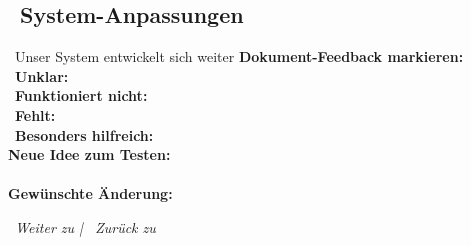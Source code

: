 \subsection*{\faLightbulb~System-Anpassungen}

\begin{ctmmOrangeBox}{\faWrench~Unser System entwickelt sich weiter}
\textbf{Dokument-Feedback markieren:}\\
\faThumbtack~\textbf{Unklar:} \\
\faTimes~\textbf{Funktioniert nicht:} \\
\faPlus~\textbf{Fehlt:} \\
\faStar~\textbf{Besonders hilfreich:} \\[0.3cm]

\textbf{Neue Idee zum Testen:}\\
\\[0.3cm]

\textbf{Gewünschte Änderung:}\\
\end{ctmmOrangeBox}

\vspace{1cm}
\begin{center}
\textit{\textcolor{ctmmGreen}{\faChevronRight~Weiter zu}  | \textcolor{ctmmBlue}{\faHome~Zurück zu} }
\end{center}
